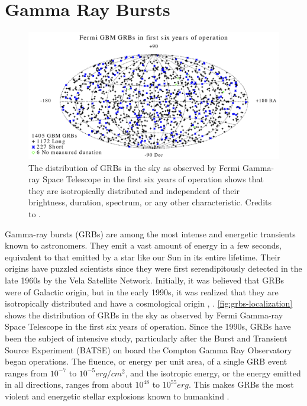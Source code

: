 \section{Gamma Ray Bursts}
\label{s:Gamma-Ray-Bursts}
\begin{figure}[t]
\centering
\includegraphics[width=0.9\linewidth]{figures/introduction/grbs.png}
\caption{The distribution of GRBs in the sky as observed by Fermi Gamma-ray Space Telescope in the first six years of operation shows that they are isotropically distributed and independent of their brightness, duration, spectrum, or any other characteristic. Credits to \cite{fermiwebsite}.}
\label{fig:grbs-localization}
\end{figure}
Gamma-ray bursts (GRBs) are among the most intense and energetic transients known to astronomers. They emit a vast amount of energy in a few seconds, equivalent to that emitted by a star like our Sun in its entire lifetime. Their origins have puzzled scientists since they were first serendipitously detected in the late 1960s by the Vela Satellite Network. Initially, it was believed that GRBs were of Galactic origin, but in the early 1990s, it was realized that they are isotropically distributed and have a cosmological origin \cite{mao_paczynski_1992}, \cite{meegan_fishman_wilson_1992}. \autoref{fig:grbs-localization} shows the distribution of GRBs in the sky as observed by Fermi Gamma-ray Space Telescope in the first six years of operation. Since the 1990s, GRBs have been the subject of intensive study, particularly after the Burst and Transient Source Experiment (BATSE) on board the Compton Gamma Ray Observatory began operations. The fluence, or energy per unit area, of a single GRB event ranges from $10^{-7}$ to $10^{-5} erg/cm^2$, and the isotropic energy, or the energy emitted in all directions, ranges from about $10^{48}$ to $10^{55} erg$. This makes GRBs the most violent and energetic stellar explosions known to humankind \cite{Kumar_Zhang_2015}.
